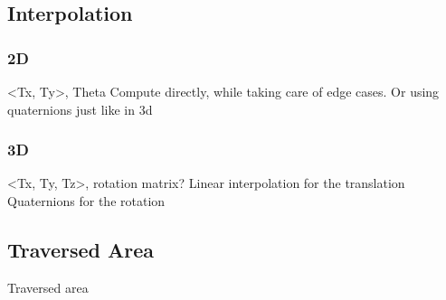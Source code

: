 	\subsection{Interpolation}

		\subsubsection{2D}

		<Tx, Ty>, Theta
		Compute directly, while taking care of edge cases.
		Or using quaternions just like in 3d

		\subsubsection{3D}

		<Tx, Ty, Tz>, rotation matrix?
		Linear interpolation for the translation
		Quaternions for the rotation

	\subsection{Traversed Area}

	Traversed area
		